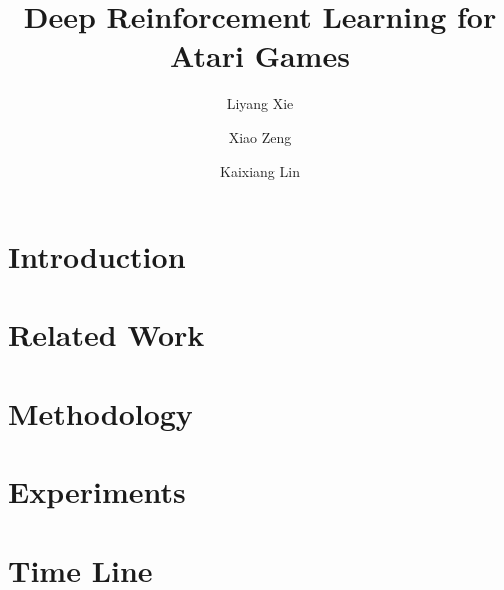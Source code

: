 \documentclass[10pt,twocolumn,letterpaper]{article}
\begin{document}
\title{Deep Reinforcement Learning for Atari Games}

\author{Liyang Xie \and Xiao Zeng \and Kaixiang Lin\\}

\maketitle


\begin{abstract}

\end{abstract}

\section{Introduction}




\section{Related Work}




\section{Methodology}





\section{Experiments}






\section{Time Line}






{\small


}
\end{document}

